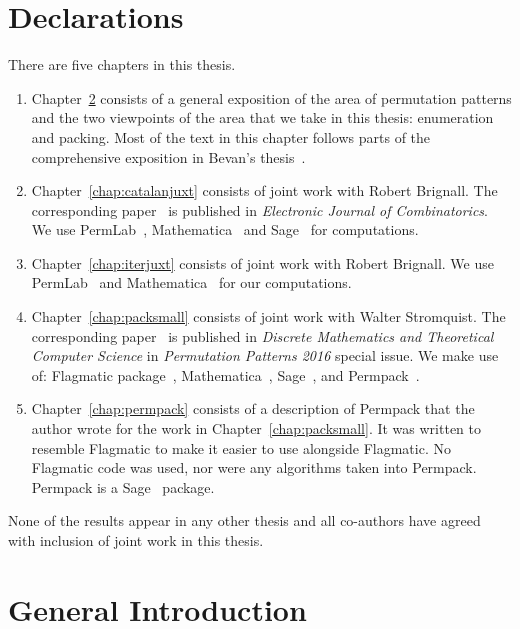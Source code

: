 \documentclass[12pt, a4paper, twoside]{report}
\begin{document}
\chapter{Declarations}
There are five chapters in this thesis.
\begin{enumerate}
\item Chapter~\ref{chap:general_intro} consists of a general exposition of the area of permutation patterns and the two viewpoints of the area that we take in this thesis: enumeration and packing. Most of the text in this chapter follows parts of the comprehensive exposition in Bevan's thesis~\cite{bevan2015thesis}.
\item Chapter~\ref{chap:catalanjuxt} consists of joint work with Robert Brignall. The corresponding paper~\cite{brignallsliacanjuxt} is published in \emph{Electronic Journal of Combinatorics}. We use PermLab~\cite{albertpermlab}, Mathematica~\cite{mathematica} and Sage~\cite{sagemath} for computations.
\item Chapter~\ref{chap:iterjuxt} consists of joint work with Robert Brignall. We use PermLab~\cite{albertpermlab} and Mathematica~\cite{mathematica} for our computations.
\item Chapter~\ref{chap:packsmall} consists of joint work with Walter Stromquist. The corresponding paper~\cite{sliacanstromquistpacking} is published in \emph{Discrete Mathematics and Theoretical Computer Science} in \emph{Permutation Patterns 2016} special issue. We make use of: Flagmatic package~\cite{flagmatic}, Mathematica~\cite{mathematica}, Sage~\cite{sagemath}, and Permpack~\cite{permpack}.
\item Chapter~\ref{chap:permpack} consists of a description of Permpack that the author wrote for the work in Chapter~\ref{chap:packsmall}. It was written to resemble Flagmatic to make it easier to use alongside Flagmatic. No Flagmatic code was used, nor were any algorithms taken into Permpack. Permpack is a Sage~\cite{sagemath} package.
\end{enumerate}
None of the results appear in any other thesis and all co-authors have agreed with inclusion of joint work in this thesis.
\afterpage{\null\newpage}


\setlength{\parskip}{0em}
\setcounter{secnumdepth}{3}
\tableofcontents
\setlength{\parskip}{1em}
\chapter{General Introduction}
\label{chap:general_intro}
%
\end{document}
